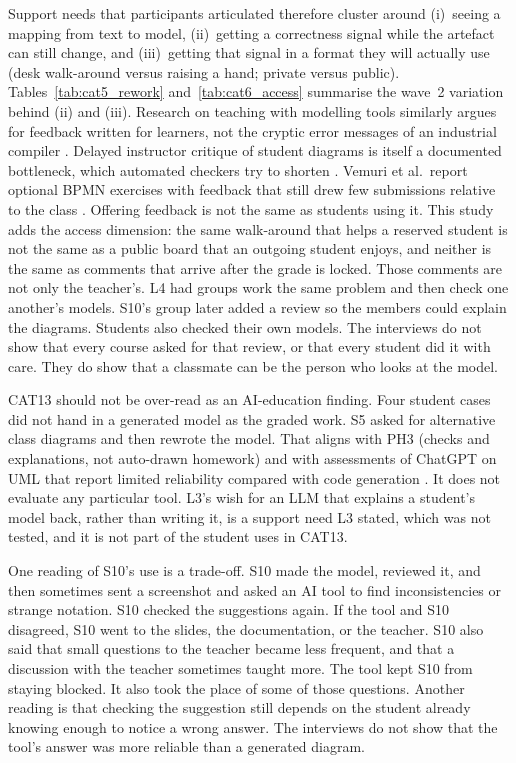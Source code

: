 Support needs that participants articulated therefore cluster around (i)~seeing a mapping from text to model, (ii)~getting a correctness signal while the artefact can still change, and (iii)~getting that signal in a format they will actually use (desk walk-around versus raising a hand; private versus public). Tables~\ref{tab:cat5_rework} and~\ref{tab:cat6_access} summarise the wave~2 variation behind (ii) and (iii). Research on teaching with modelling tools similarly argues for feedback written for learners, not the cryptic error messages of an industrial compiler \cite{liebel2017model}. Delayed instructor critique of student diagrams is itself a documented bottleneck, which automated checkers try to shorten \cite{hasker2011umlint,foss2022autoer}. Vemuri et al.\ report optional BPMN exercises with feedback that still drew few submissions relative to the class \cite{vemuri2023feedback}. Offering feedback is not the same as students using it. This study adds the access dimension: the same walk-around that helps a reserved student is not the same as a public board that an outgoing student enjoys, and neither is the same as comments that arrive after the grade is locked. Those comments are not only the teacher's. L4 had groups work the same problem and then check one another's models. S10's group later added a review so the members could explain the diagrams. Students also checked their own models. The interviews do not show that every course asked for that review, or that every student did it with care. They do show that a classmate can be the person who looks at the model.

CAT13 should not be over-read as an AI-education finding. Four student cases did not hand in a generated model as the graded work. S5 asked for alternative class diagrams and then rewrote the model. That aligns with PH3 (checks and explanations, not auto-drawn homework) and with assessments of ChatGPT on UML that report limited reliability compared with code generation \cite{camara2023chatgpt}. It does not evaluate any particular tool. L3's wish for an LLM that explains a student's model back, rather than writing it, is a support need L3 stated, which was not tested, and it is not part of the student uses in CAT13.

One reading of S10's use is a trade-off. S10 made the model, reviewed it, and then sometimes sent a screenshot and asked an AI tool to find inconsistencies or strange notation. S10 checked the suggestions again. If the tool and S10 disagreed, S10 went to the slides, the documentation, or the teacher. S10 also said that small questions to the teacher became less frequent, and that a discussion with the teacher sometimes taught more. The tool kept S10 from staying blocked. It also took the place of some of those questions. Another reading is that checking the suggestion still depends on the student already knowing enough to notice a wrong answer. The interviews do not show that the tool's answer was more reliable than a generated diagram.

